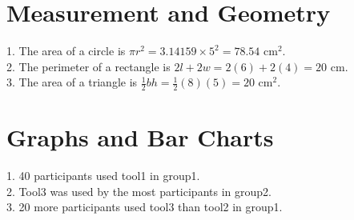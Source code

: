 \documentclass{article}
\begin{document}
\section{Measurement and Geometry}
1. The area of a circle is $\pi r^2 = 3.14159 \times 5^2 = 78.54$ cm$^2$. \\
2. The perimeter of a rectangle is $2l + 2w = 2(6) + 2(4) = 20$ cm. \\
3. The area of a triangle is $\frac{1}{2}bh = \frac{1}{2}(8)(5) = 20$ cm$^2$. \\

\section{Graphs and Bar Charts}
1. 40 participants used tool1 in group1. \\
2. Tool3 was used by the most participants in group2. \\
3. 20 more participants used tool3 than tool2 in group1. \\
\end{document}
